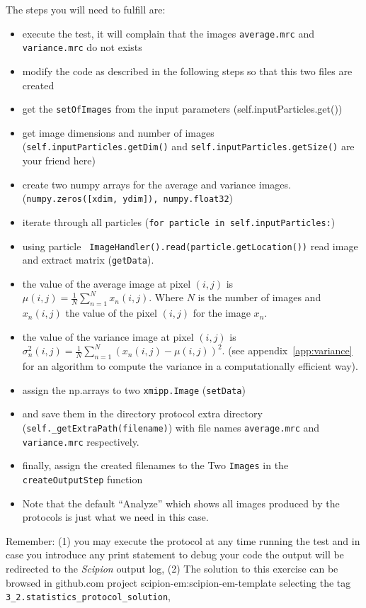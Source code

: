 \documentclass[12pt]{article} %
\def\scipion{\textit{Scipion}\xspace}
\newcommand{\ttt}[1]{\texttt{#1}}
\begin{document}
The steps you will need to fulfill are:
\begin{itemize}
 \item execute the test, it will complain that the images \ttt{average.mrc} and \ttt{variance.mrc} do not exists
 \item modify the code as described in the following steps so that this two files are created
 \item get the \ttt{setOfImages} from the input parameters (self.inputParticles.get())
 \item get image dimensions and number of images (\ttt{self.inputParticles.getDim()} and \ttt{self.inputParticles.getSize()} are your friend here)
 \item create two numpy arrays for the average and variance images. (\ttt{numpy.zeros([xdim, ydim]), numpy.float32})
 \item iterate through all particles (\ttt{for particle in self.inputParticles:})
 \item using particle \ttt{ ImageHandler().read(particle.getLocation())} read image and extract matrix (\ttt{getData}).
 \item the value of the average image at pixel $(i,j)$ is $\mu(i,j)=\frac {1}{N}\sum _{n=1}^{N}x_n(i,j)$. Where $N$ is the number of images and $x_n(i,j)$ the value of the pixel $(i,j)$ for the image $x_n$.
 \item the value of the variance image at pixel $(i,j)$ is\\ $\sigma^2_n(i,j)={ {{\frac {1}{N}}\sum _{n=1}^{N}\left(x_n(i,j)-{\mu(i,j)}\right)^{2}}}$. (see appendix~\ref{app:variance} for an algorithm to compute the variance in a computationally efficient way).
 \item assign the np.arrays to two \ttt{xmipp.Image} (\ttt{setData})
 \item and save them in the directory protocol extra directory (\ttt{self.\_getExtraPath(filename)}) with file names \ttt{average.mrc} and \ttt{variance.mrc} respectively.
 \item finally, assign the created filenames to the Two \ttt{Images} in the \ttt{createOutputStep} function
 \item Note that the default ``Analyze'' which shows all images produced by the protocols is just what we need in this case.
\end{itemize}

Remember: (1)  you may execute the protocol at any time running the test and in case you introduce
any print statement to debug your code the output will be redirected to the \scipion output log, (2) The solution
to this exercise can be browsed in github.com project scipion-em:scipion-em-template selecting the tag \ttt{3\_2.statistics\_protocol\_solution},
\end{document}
